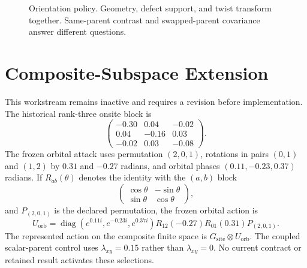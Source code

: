 \documentclass[11pt]{article}
\begin{document}
\begin{figure}[htbp]
  \centering
  \caption{Orientation policy.  Geometry, defect support, and twist transform together.
  Same-parent contrast and swapped-parent covariance answer different questions.}
  \label{fig:orientation-schematic}
\end{figure}

\section{Composite-Subspace Extension}

This workstream remains inactive and requires a revision before implementation.  The
historical rank-three onsite block is
\begin{equation}
  \begin{pmatrix}
  -0.30 & 0.04 & -0.02\\
  0.04 & -0.16 & 0.03\\
  -0.02 & 0.03 & -0.08
  \end{pmatrix}.
\end{equation}
The frozen orbital attack uses permutation $(2,0,1)$, rotations in pairs $(0,1)$ and
$(1,2)$ by $0.31$ and $-0.27$ radians, and orbital phases
$(0.11,-0.23,0.37)$ radians.  If $R_{ab}(\theta)$ denotes the identity with the
$(a,b)$ block
\begin{equation}
  \begin{pmatrix}
    \cos\theta & -\sin\theta\\
    \sin\theta & \cos\theta
  \end{pmatrix},
\end{equation}
and $P_{(2,0,1)}$ is the declared permutation, the frozen orbital action is
\begin{equation}
  U_{\mathrm{orb}}
  =\operatorname{diag}\!\left(e^{0.11i},e^{-0.23i},e^{0.37i}\right)
   R_{12}(-0.27)R_{01}(0.31)P_{(2,0,1)}.
\end{equation}
The represented action on the composite finite space is
$G_{\mathrm{site}}\otimes U_{\mathrm{orb}}$.  The coupled scalar-parent control uses
$\lambda_{xy}=0.15$ rather than $\lambda_{xy}=0$.  No current contract or retained
result activates these selections.
\end{document}
